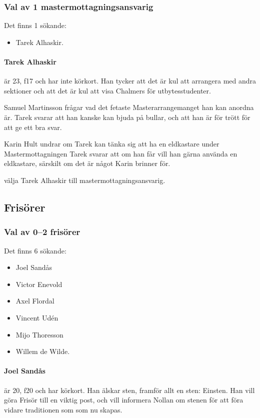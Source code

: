 \documentclass[hidelinks]{sektionsmote}
\begin{document}
\subsubsection{Val av 1 mastermottagningsansvarig}
Det finns 1 sökande:
\begin{itemize}
    \item Tarek Alhaskir.
\end{itemize}

\paragraph{Tarek Alhaskir} är 23, f17 och har inte körkort.
Han tycker att det är kul att arrangera med andra sektioner och att det är kul att visa Chalmers för utbytesstudenter.

Samuel Martinsson frågar vad det fetaste Masterarrangemanget han kan anordna är.
Tarek svarar att han kanske kan bjuda på bullar, och att han är för trött för att ge ett bra svar.

Karin Hult undrar om Tarek kan tänka sig att ha en eldkastare under Mastermottagningen
Tarek svarar att om han får vill han gärna använda en eldkastare, särskilt om det är något Karin brinner för.

\begin{beslut}
  \item välja Tarek Alhaskir till mastermottagningsansvarig.
\end{beslut}


\subsection{Frisörer}
\subsubsection{Val av 0--2 frisörer}
Det finns 6 sökande:
\begin{itemize}
    \item Joel Sandås
    \item Victor Enevold
    \item Axel Flordal
    \item Vincent Udén
    \item Mijo Thoresson
    \item Willem de Wilde.
\end{itemize}

\paragraph{Joel Sandås} är 20, f20 och har körkort.
Han älskar sten, framför allt en sten: Einsten.
Han vill göra Frisör till en viktig post, och vill informera Nollan om stenen för att föra vidare traditionen som som nu skapas.
\end{document}
